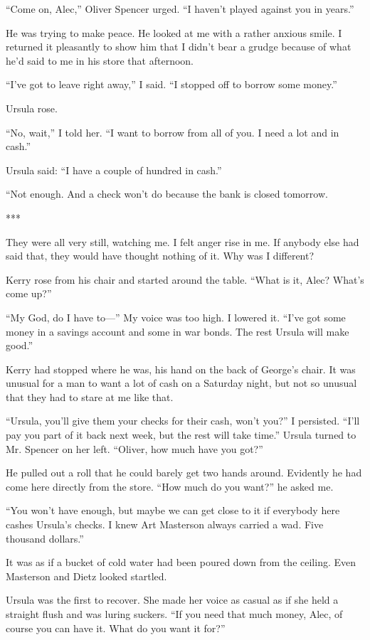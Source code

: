 \documentclass{novel}
\begin{document}
{“Come on, Alec,” Oliver Spencer urged. “I haven’t played against you in years.”

He was trying to make peace. He looked at me with a rather anxious smile. I returned it pleasantly to show him that I didn’t bear a grudge because of what he’d said to me in his store that afternoon.

“I’ve got to leave right away,” I said. “I stopped off to borrow some money.”

Ursula rose.

“No, wait,” I told her. “I want to borrow from all of you. I need a lot and in cash.”

Ursula said: “I have a couple of hundred in cash.”

“Not enough. And a check won’t do because the bank is closed tomorrow.

***

They were all very still, watching me. I felt anger rise in me. If anybody else had said that, they would have thought nothing of it. Why was I different?

Kerry rose from his chair and started around the table. “What is it, Alec? What’s come up?”

“My God, do I have to—” My voice was too high. I lowered it. “I’ve got some money in a savings account and some in war bonds. The rest Ursula will make good.”

Kerry had stopped where he was, his hand on the back of George’s chair. It was unusual for a man to want a lot of cash on a Saturday night, but not so unusual that they had to stare at me like that.

“Ursula, you’ll give them your checks for their cash, won’t you?” I persisted. “I’ll pay you part of it back next week, but the rest will take time.” Ursula turned to Mr. Spencer on her left. “Oliver, how much have you got?”

He pulled out a roll that he could barely get two hands around. Evidently he had come here directly from the store. “How much do you want?” he asked me.

“You won’t have enough, but maybe we can get close to it if everybody here cashes Ursula’s checks. I knew Art Masterson always carried a wad. Five thousand dollars.”

It was as if a bucket of cold water had been poured down from the ceiling. Even Masterson and Dietz looked startled.

Ursula was the first to recover. She made her voice as casual as if she held a straight flush and was luring suckers. “If you need that much money, Alec, of course you can have it. What do you want it for?”

}
\end{document}
